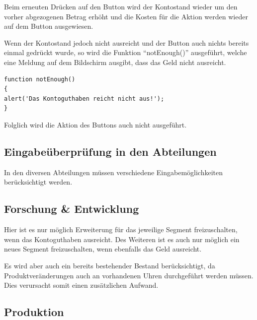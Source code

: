 Beim erneuten Drücken auf den Button wird der Kontostand wieder um den vorher abgezogenen Betrag erhöht und die Kosten für die Aktion werden wieder auf dem Button ausgewiesen. 

Wenn der Kontostand jedoch nicht ausreicht und der Button auch nichts bereits einmal gedrückt wurde, so wird die Funktion \enquote{notEnough()} ausgeführt, welche eine Meldung auf dem Bildschirm ausgibt, dass das Geld nicht ausreicht. 

\lstset{language=Java}
\begin{lstlisting}
function notEnough()
{
alert('Das Kontoguthaben reicht nicht aus!');
}
\end{lstlisting}

Folglich wird die Aktion des Buttons auch nicht ausgeführt.

\subsection*{Eingabeüberprüfung in den Abteilungen}

In den diversen Abteilungen müssen verschiedene Eingabemöglichkeiten berücksichtigt werden. 

\subsection*{Forschung \& Entwicklung}

Hier ist es nur möglich Erweiterung für das jeweilige Segment freizuschalten, wenn das Kontoguthaben ausreicht. Des Weiteren ist es auch nur möglich ein neues Segment freizuschalten, wenn ebenfalls das Geld ausreicht.

Es wird aber auch ein bereits bestehender Bestand berücksichtigt, da Produktveränderungen auch an vorhandenen Uhren durchgeführt werden müssen. Dies verursacht somit einen zusätzlichen Aufwand. 

\subsection*{Produktion}

